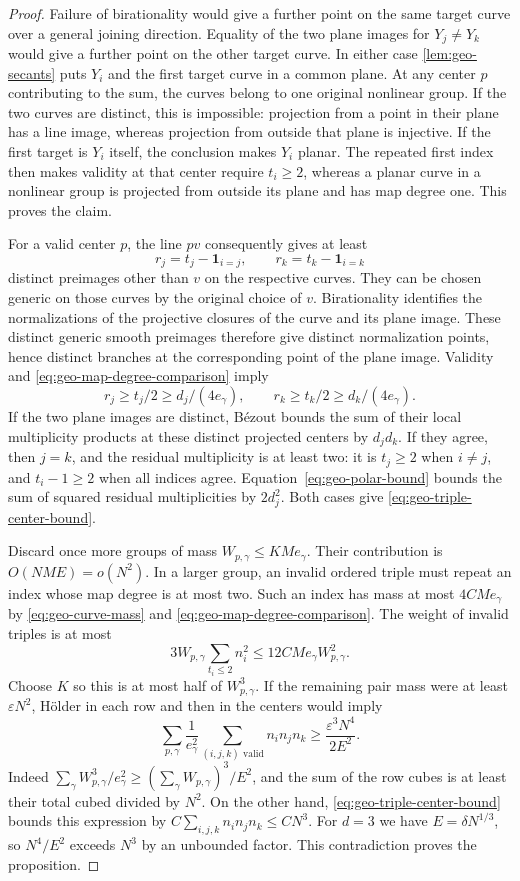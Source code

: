 \begin{proof}
Failure of birationality would give a further point on the same target curve over a general joining direction. Equality of the two plane images for $Y_j\ne Y_k$ would give a further point on the other target curve. In either case \cref{lem:geo-secants} puts $Y_i$ and the first target curve in a common plane. At any center $p$ contributing to the sum, the curves belong to one original nonlinear group. If the two curves are distinct, this is impossible: projection from a point in their plane has a line image, whereas projection from outside that plane is injective. If the first target is $Y_i$ itself, the conclusion makes $Y_i$ planar. The repeated first index then makes validity at that center require $t_i\ge2$, whereas a planar curve in a nonlinear group is projected from outside its plane and has map degree one. This proves the claim.

For a valid center $p$, the line $pv$ consequently gives at least
\[
 r_j=t_j-\mathbf1_{i=j},\qquad
 r_k=t_k-\mathbf1_{i=k}
\]
distinct preimages other than $v$ on the respective curves. They can be chosen generic on those curves by the original choice of $v$. Birationality identifies the normalizations of the projective closures of the curve and its plane image. These distinct generic smooth preimages therefore give distinct normalization points, hence distinct branches at the corresponding point of the plane image. Validity and \eqref{eq:geo-map-degree-comparison} imply
\[
 r_j\ge t_j/2\ge d_j/(4e_\gamma),\qquad
 r_k\ge t_k/2\ge d_k/(4e_\gamma).
\]
If the two plane images are distinct, B\'ezout bounds the sum of their local multiplicity products at these distinct projected centers by $d_jd_k$. If they agree, then $j=k$, and the residual multiplicity is at least two: it is $t_j\ge2$ when $i\ne j$, and $t_i-1\ge2$ when all indices agree. Equation~\eqref{eq:geo-polar-bound} bounds the sum of squared residual multiplicities by $2d_j^2$. Both cases give \eqref{eq:geo-triple-center-bound}.

Discard once more groups of mass $W_{p,\gamma}\le KMe_\gamma$. Their contribution is $O(NME)=o(N^2)$. In a larger group, an invalid ordered triple must repeat an index whose map degree is at most two. Such an index has mass at most $4CMe_\gamma$ by \eqref{eq:geo-curve-mass} and \eqref{eq:geo-map-degree-comparison}. The weight of invalid triples is at most
\[
 3W_{p,\gamma}\sum_{t_i\le2}n_i^2
 \le 12CMe_\gamma W_{p,\gamma}^2.
\]
Choose $K$ so this is at most half of $W_{p,\gamma}^3$. If the remaining pair mass were at least $\varepsilon N^2$, H\"older in each row and then in the centers would imply
\[
 \sum_{p,\gamma}\frac{1}{e_\gamma^2}
       \sum_{(i,j,k)\text{ valid}}n_i n_j n_k
 \ge \frac{\varepsilon^3N^4}{2E^2}.
\]
Indeed $\sum_\gamma W_{p,\gamma}^3/e_\gamma^2\ge (\sum_\gamma W_{p,\gamma})^3/E^2$, and the sum of the row cubes is at least their total cubed divided by $N^2$. On the other hand, \eqref{eq:geo-triple-center-bound} bounds this expression by $C\sum_{i,j,k}n_i n_j n_k\le CN^3$. For $d=3$ we have $E=\delta N^{1/3}$, so $N^4/E^2$ exceeds $N^3$ by an unbounded factor. This contradiction proves the proposition.
\end{proof}

